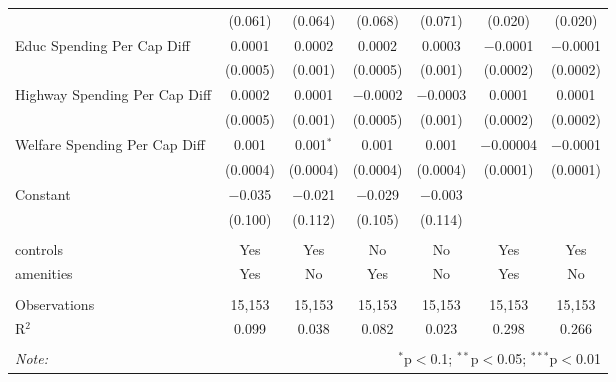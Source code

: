 \begin{table}[!htbp]
\begin{tabular}{@{\extracolsep{5pt}}lcccccc}
  & (0.061) & (0.064) & (0.068) & (0.071) & (0.020) & (0.020) \\ 
  Educ Spending Per Cap Diff & 0.0001 & 0.0002 & 0.0002 & 0.0003 & $-$0.0001 & $-$0.0001 \\ 
  & (0.0005) & (0.001) & (0.0005) & (0.001) & (0.0002) & (0.0002) \\ 
  Highway Spending Per Cap Diff & 0.0002 & 0.0001 & $-$0.0002 & $-$0.0003 & 0.0001 & 0.0001 \\ 
  & (0.0005) & (0.001) & (0.0005) & (0.001) & (0.0002) & (0.0002) \\ 
  Welfare Spending Per Cap Diff & 0.001 & 0.001$^{*}$ & 0.001 & 0.001 & $-$0.00004 & $-$0.0001 \\ 
  & (0.0004) & (0.0004) & (0.0004) & (0.0004) & (0.0001) & (0.0001) \\ 
  Constant & $-$0.035 & $-$0.021 & $-$0.029 & $-$0.003 &  &  \\ 
  & (0.100) & (0.112) & (0.105) & (0.114) &  &  \\ 
 \hline \\[-1.8ex] 
controls & Yes & Yes & No & No & Yes & Yes \\ 
amenities & Yes & No & Yes & No & Yes & No \\ 
\hline \\[-1.8ex] 
Observations & 15,153 & 15,153 & 15,153 & 15,153 & 15,153 & 15,153 \\ 
R$^{2}$ & 0.099 & 0.038 & 0.082 & 0.023 & 0.298 & 0.266 \\ 
\hline 
\hline \\[-1.8ex] 
\textit{Note:}  & \multicolumn{6}{r}{$^{*}$p$<$0.1; $^{**}$p$<$0.05; $^{***}$p$<$0.01} \\ 
\end{tabular} 
\end{table} 
